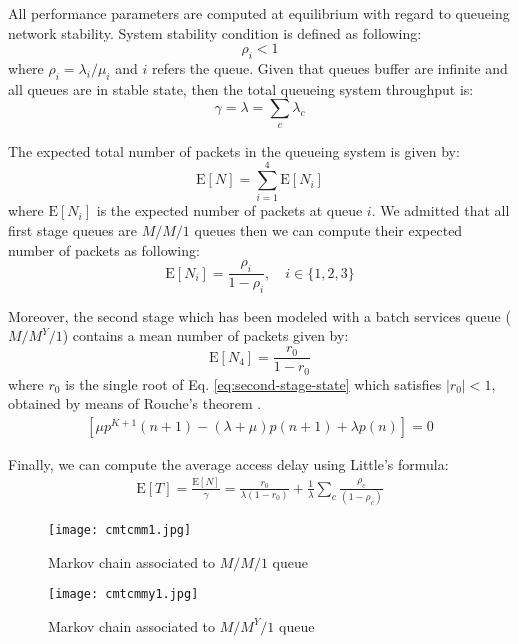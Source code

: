 \documentclass[a4paper,10pt]{IEEEtran}
\begin{document}
All performance parameters are computed at equilibrium with regard
to queueing network stability. System stability condition is defined
as following:
\begin{equation}
\rho_{i} < 1
\end{equation}
where $\rho_{i} = \lambda_{i}/\mu_{i}$ and $i$ refers the queue.
Given that queues buffer are infinite and all queues are in stable
state, then the total queueing system throughput is:
\begin{equation}\label{eq:throughput}
\gamma = \lambda = \sum_{c} \lambda_{c}
\end{equation}

The expected total number of packets in the queueing system is given
by:
\begin{equation}\label{eq:total-packets-expected-number}
\text{E}[N] = \sum_{i = 1}^{4} \text{E}[N_{i}]
\end{equation}
where $\text{E}[N_{i}]$ is the expected number of packets at queue
$i$. We admitted that all first stage queues are $M/M/1$ queues then
we can compute their expected number of packets as following:
\begin{equation}\label{eq:packets-expected-number1}
\text{E}[N_{i}] = \frac{\rho_{i}}{1 - \rho_{i}}, \quad i \in \{1, 2,
3\}
\end{equation}

Moreover, the second stage which has been modeled with a batch
services queue ($M/M^{Y}/1$) contains a mean number of packets given
by:
\begin{equation}\label{eq:packets-expected-number2}
\text{E}[N_{4}] = \frac{r_{0}}{1 - r_{0}}
\end{equation}
where $r_{0}$ is the single root of Eq. \ref{eq:second-stage-state}
which satisfies $|r_0|<1$, obtained by means of Rouche's theorem
\cite{Pujolle:1989}.
\begin{gather}\label{eq:second-stage-state}
[\mu p^{K+1}(n+1) - (\lambda + \mu)p(n+1)+ \lambda p(n)] = 0
\end{gather}

Finally, we can compute the average access delay using Little's
formula:
\begin{gather}\label{eq:average-access-delay}
\text{E}[T]=\frac{\text{E}[N]}{\gamma}=\frac{r_0}{\lambda(1 - r_0)}
+ \frac{1}{\lambda} \sum_{c} \frac{\rho_{c}}{(1 - \rho_{c})}
\end{gather}
\begin{figure}\centering
\texttt{[image: cmtcmm1.jpg]}
\caption{Markov chain associated to $M/M/1$ queue}
\label{cmtc-model1}
\end{figure}
\begin{figure}
\centering
\texttt{[image: cmtcmmy1.jpg]}
\caption{Markov chain associated to $M/M^{Y}/1$ queue}
\label{cmtc-model2}
\end{figure}
\end{document}
